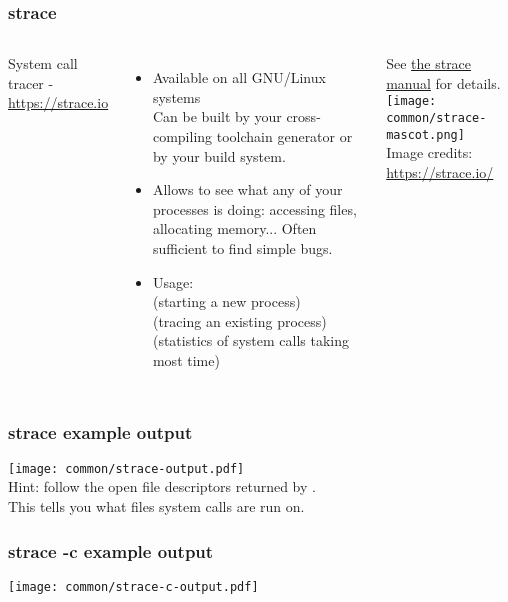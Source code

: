 \begin{frame}[fragile]
  \frametitle{strace}
  \begin{columns}
  \small
  System call tracer - \url{https://strace.io}
  \begin{itemize}
  \item Available on all GNU/Linux systems\\
        Can be built by your cross-compiling toolchain generator or by your build system.
  \item Allows to see what any of your processes is doing: accessing files, allocating memory...
        Often sufficient to find simple bugs.
  \item Usage:\\
     (starting a new process)\\
     (tracing an existing process)\\
     (statistics of system calls taking most time)
  \end{itemize}
  See \href{https://man7.org/linux/man-pages/man1/strace.1.html}{the strace manual} for details.
  \texttt{[image: common/strace-mascot.png]}\\
  \tiny Image credits: \url{https://strace.io/}
  \end{columns}
\end{frame}

\begin{frame}[fragile]
  \frametitle{strace example output}
  \texttt{[image: common/strace-output.pdf]}\\
  Hint: follow the open file descriptors returned by . \\
  This tells you what files system calls are run on.
\end{frame}

\begin{frame}[fragile]
  \frametitle{strace -c example output}
  \texttt{[image: common/strace-c-output.pdf]}
\end{frame}
